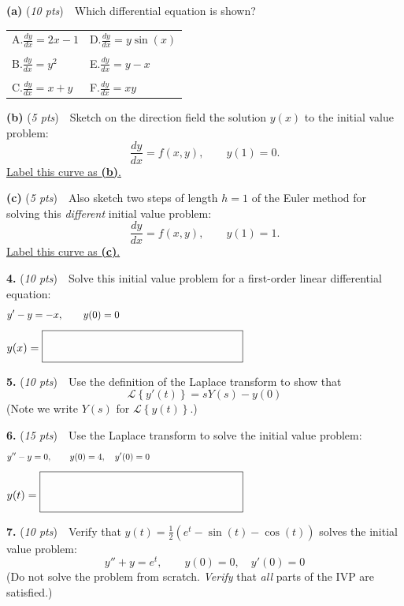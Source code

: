 \documentclass[11pt,reqno]{amsart}
\newcommand{\LLL}[1]{\mathcal{L}\left\{#1\right\}}
\newcommand{\prob}[1]{\bigskip\noindent\textbf{#1.} }
\newcommand{\pts}[1]{(\emph{#1 pts})}
\newcommand{\probpts}[2]{\prob{#1} \pts{#2} \,\,}
\newcommand{\epartpts}[2]{\medskip\noindent \textbf{(#1)} \pts{#2} \,\,}
\newcommand*\circled[1]{\tikz[baseline=(char.base)]{
            \node[shape=ellipse,draw,inner sep=2pt] (char) {#1};}}
\begin{document}
\epartpts{a}{10}  Which differential equation is shown?  \circled{Circle one.}

\bigskip
\begin{center}
\begin{tabular}{ll}
A.\quad $\displaystyle \frac{dy}{dx} = 2x-1$ \hspace{35mm} & D.\quad $\displaystyle \frac{dy}{dx} = y\sin(x)$ \\
\\
B.\quad $\displaystyle \frac{dy}{dx} = y^2$ & E.\quad $\displaystyle \frac{dy}{dx} = y-x$ \\
\\
C.\quad $\displaystyle \frac{dy}{dx} = x+y$ & F.\quad $\displaystyle \frac{dy}{dx} = xy$
\end{tabular}
\end{center}

\bigskip\bigskip
\epartpts{b}{5}  Sketch on the direction field the solution $y(x)$ to the initial value problem:
    $$\frac{dy}{dx} = f(x,y), \qquad y(1)=0.$$
\underline{Label this curve as {\Large \textbf{(b)}}.}

\bigskip\bigskip
\epartpts{c}{5}  Also sketch two steps of length $h=1$ of the Euler method for solving this \emph{different} initial value problem:
    $$\frac{dy}{dx} = f(x,y), \qquad y(1)=1.$$
\underline{Label this curve as {\Large \textbf{(c)}}.}

\newpage
\probpts{4}{10}  Solve this initial value problem for a first-order linear differential equation:
    $$y' - y = -x, \qquad y(0) = 0 \hspace{100mm}$$
\vfill
\hfill $y(x) = \fbox{\LARGE \strut \hspace{60mm} \strut}$

\probpts{5}{10}  Use the definition of the Laplace transform to show that
    $$\LLL{y'(t)} = s Y(s) - y(0)$$
(Note we write $Y(s)$ for $\LLL{y(t)}$.)
\vfill

\newpage
\probpts{6}{15}  Use the Laplace transform to solve the initial value problem:
    $$y'' - y = 0, \qquad y(0) = 4, \quad y'(0)=0 \hspace{100mm}$$
\vfill
\hfill $y(t) = \fbox{\Huge \strut \hspace{60mm} \strut}$

\newpage
\probpts{7}{10}  Verify that $\displaystyle y(t)=\frac{1}{2} \left(e^t - \sin(t) - \cos(t)\right)$ solves the initial value problem:
    $$y''+y=e^t, \qquad y(0)=0, \quad y'(0)=0$$
(Do not solve the problem from scratch.  \emph{Verify} that \emph{all} parts of the IVP are satisfied.)
\vfill
\end{document}
